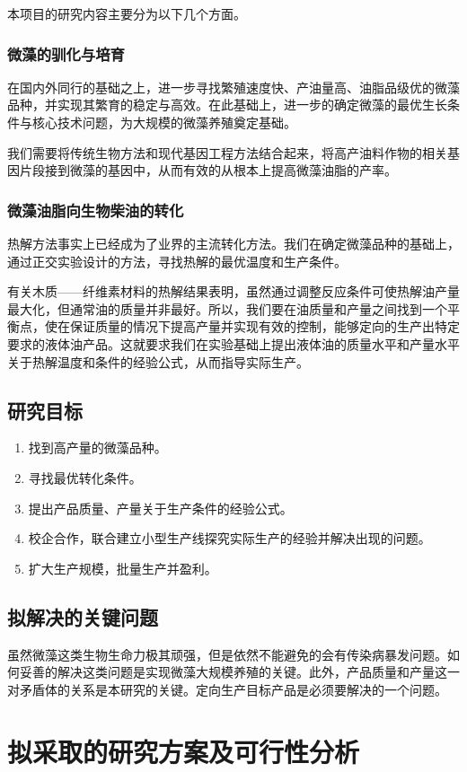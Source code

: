 \documentclass[a4paper,12pt]{report}
\begin{document}
本项目的研究内容主要分为以下几个方面。
\subsection{微藻的驯化与培育}
在国内外同行的基础之上，进一步寻找繁殖速度快、产油量高、油脂品级优的微藻品种，并实现其繁育的稳定与高效。在此基础上，进一步的确定微藻的最优生长条件与核心技术问题，为大规模的微藻养殖奠定基础。

我们需要将传统生物方法和现代基因工程方法结合起来，将高产油料作物的相关基因片段接到微藻的基因中，从而有效的从根本上提高微藻油脂的产率。

\subsection{微藻油脂向生物柴油的转化}
热解方法事实上已经成为了业界的主流转化方法。我们在确定微藻品种的基础上，通过正交实验设计的方法，寻找热解的最优温度和生产条件。

有关木质——纤维素材料的热解结果表明，虽然通过调整反应条件可使热解油产量最大化，但通常油的质量并非最好。\cite{Miao2003}所以，我们要在油质量和产量之间找到一个平衡点，使在保证质量的情况下提高产量并实现有效的控制，能够定向的生产出特定要求的液体油产品。这就要求我们在实验基础上提出液体油的质量水平和产量水平关于热解温度和条件的经验公式，从而指导实际生产。

\section{研究目标}
\begin{enumerate}
	\item  找到高产量的微藻品种。
	\item   寻找最优转化条件。
	\item   提出产品质量、产量关于生产条件的经验公式。
	\item   校企合作，联合建立小型生产线探究实际生产的经验并解决出现的问题。
	\item    扩大生产规模，批量生产并盈利。
\end{enumerate}

\section{拟解决的关键问题}
虽然微藻这类生物生命力极其顽强，但是依然不能避免的会有传染病暴发问题。如何妥善的解决这类问题是实现微藻大规模养殖的关键。此外，产品质量和产量这一对矛盾体的关系是本研究的关键。定向生产目标产品是必须要解决的一个问题。

\chapter{拟采取的研究方案及可行性分析}
\end{document}
